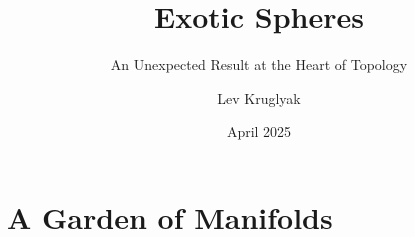 \documentclass{lkx_thesis}
\title{Exotic Spheres}
\subtitle{An Unexpected Result at the Heart of Topology}
\author{Lev Kruglyak}
\date{April 2025}
\begin{document}
% 

\lkxtoc



\part{A Garden of Manifolds}





%
% 
% 
% 


\lkxrefs
\lkxindex
\end{document}
